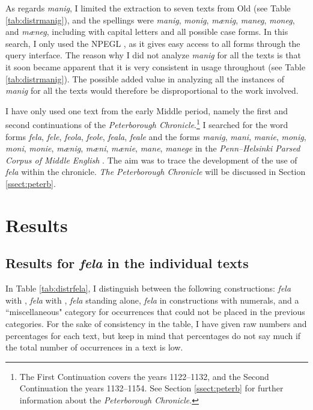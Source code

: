 \documentclass[output=paper,colorlinks,citecolor=brown]{langscibook}
\begin{document}
As regards \textit{manig}, I limited the extraction to seven texts from Old  (see Table \ref{tab:distrmanig}), and the spellings were \textit{manig}, \textit{monig}, \textit{mænig}, \textit{maneg}, \textit{moneg}, and \textit{mæneg}, including with capital letters and all possible case forms. In this search, I only used the NPEGL , as it gives easy access to all forms through the query interface. The reason why I did not analyze \textit{manig} for all the texts is that it soon became apparent that it is very consistent in usage throughout (see Table \ref{tab:distrmanig}). The possible added value in analyzing all the instances of \textit{manig} for all the texts would therefore be disproportional to the work involved.  

I have only used one text from the early Middle  period, namely the first and second continuations of the \textit{Peterborough Chronicle}.\footnote{The First Continuation covers the years 1122–1132, and the Second Continuation the years 1132–1154. See Section \ref{ssect:peterb} for further information about the \textit{Peterborough Chronicle}.}  I searched for the word forms \textit{fela}, \textit{fele}, \textit{feola}, \textit{feole}, \textit{feala}, \textit{feale} and the forms \textit{manig}, \textit{mani}, \textit{manie}, \textit{monig}, \textit{moni}, \textit{monie}, \textit{mænig}, \textit{mæni}, \textit{mænie}, \textit{mane}, \textit{manege} in the \textit{Penn--Helsinki Parsed Corpus of Middle English} \citep[PPCME2,][]{PPCME2}. The aim was to trace the development of the use of \textit{fela} within the chronicle. \textit{The Peterborough Chronicle} will be discussed in Section \ref{ssect:peterb}.



\section{Results}\label{sect:results}

\subsection{Results for \textit{fela} in the individual texts}\label{sect:felatexts}
In Table \ref{tab:distrfela}, I distinguish between the following constructions: \textit{fela} with , \textit{fela} with , \textit{fela} standing alone, \textit{fela} in constructions with numerals, and a ``miscellaneous" category for occurrences that could not be placed in the previous categories. For the sake of consistency in the table, I have given raw numbers and percentages for each text, but keep in mind that percentages do not say much if the total number of occurrences in a text is low. 
\end{document}
